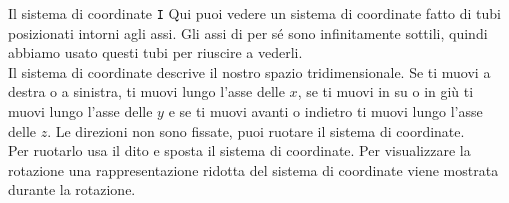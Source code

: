 \begin{surferPage}[Coordinate I]{Il sistema di coordinate {\tt I}}
Qui puoi vedere un sistema di coordinate fatto di tubi posizionati intorni agli assi. Gli assi di per s\'e sono infinitamente sottili, quindi abbiamo usato questi tubi per riuscire a vederli.\\
Il sistema di coordinate descrive il nostro spazio tridimensionale. Se ti muovi a destra o a sinistra, ti muovi lungo l'asse delle $x$, se ti muovi in su o in 
gi\`u ti muovi lungo l'asse delle $y$ e se ti muovi avanti o indietro ti muovi lungo l'asse delle $z$. Le direzioni non sono fissate,  puoi ruotare il sistema di coordinate.\\
\vspace{0.3cm}
Per ruotarlo usa il dito e sposta il sistema di coordinate. Per visualizzare la rotazione una rappresentazione ridotta del sistema di coordinate viene mostrata durante la rotazione.
\end{surferPage}

